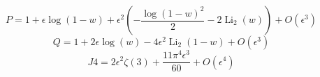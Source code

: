\[P=1 + \epsilon \log{\left(1 - w \right)} + \epsilon^{2} \left(- \frac{\log{\left(1 - w \right)}^{2}}{2} - 2 \operatorname{Li}_{2}\left(w\right)\right) + O\left(\epsilon^{3}\right)\]
\[Q=1 + 2 \epsilon \log{\left(w \right)} - 4 \epsilon^{2} \operatorname{Li}_{2}\left(1 - w\right) + O\left(\epsilon^{3}\right)\]
\[J4=2 \epsilon^{2} \zeta\left(3\right) + \frac{11 \pi^{4} \epsilon^{3}}{60} + O\left(\epsilon^{4}\right)\]

